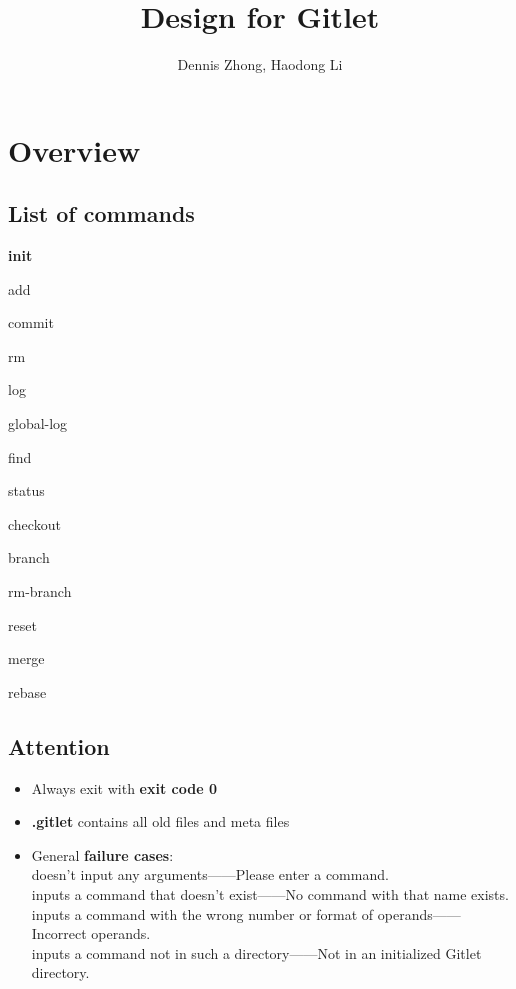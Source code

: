 \documentclass[10pt]{article}
\author{Dennis Zhong, Haodong Li}
\title{\LARGE\textbf{Design for Gitlet}}
\newcommand{\cmark}{\ding{51}}%
\newcommand{\done}{\rlap{$\square$}{\raisebox{2pt}{\large\hspace{1pt}\cmark}}%
\hspace{-2.5pt}}
\begin{document}
\maketitle
\setcounter{section}{-1}

\section{Overview} %

\subsection{List of commands} %
  \begin{adjustwidth}{2em}{0pt}
  \begin{todolist}
  \item[\done]  \bfseries init
  \item add
  \item commit
  \item rm
  \item log
  \item global-log
  \item find
  \item status
  \item checkout
  \item branch
  \item rm-branch
  \item reset
  \item merge
  \item rebase
  \end{todolist}
  \end{adjustwidth}
  
\subsection{Attention} %
  \begin{adjustwidth}{2em}{0pt}
  \begin{itemize}
  \item Always exit with \textbf{exit code 0}
  \item \textbf{.gitlet} contains all old files and meta files
  \item General \textbf{failure cases}:\\
        doesn’t input any arguments------Please enter a command.\\
        inputs a command that doesn’t exist------No command with that name exists.\\
        inputs a command with the wrong number or format of operands------Incorrect operands.\\
        inputs a command not in such a directory------Not in an initialized Gitlet directory.
  \end{itemize}
  \end{adjustwidth}
\end{document}
